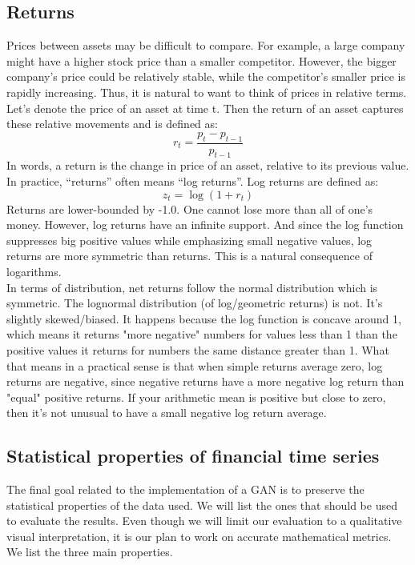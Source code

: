 \documentclass{article}
\begin{document}
\begin{multicols}{2}
    \subsection*{Returns}
    Prices between assets may be difficult to compare. For example, a large company might have a higher stock price than a smaller competitor. However, the bigger company's price could be relatively stable, while the competitor's smaller price is rapidly increasing. Thus, it is natural to want to think of prices in relative terms. Let's denote the price of an asset at time t. Then the return of an asset captures these relative movements and is defined as:
    $$r_t = \frac{p_t - p_{t-1}}{p_{t-1}}$$
    In words, a return is the change in price of an asset, relative to its previous value. In practice, “returns” often means “log returns”. Log returns are defined as:
    $$z_t = \log(1+r_t)$$
    Returns are lower-bounded by -1.0. One cannot lose more than all of one's money. However, log returns have an infinite support. And since the log function suppresses big positive values while emphasizing small negative values, log returns are more symmetric than returns. This is a natural consequence of logarithms.\\
    In terms of distribution, net returns follow the normal distribution which is symmetric. The lognormal distribution (of log/geometric returns) is not. It's slightly skewed/biased. It happens because the log function is concave around 1, which means it returns "more negative" numbers for values less than 1 than the positive values it returns for numbers the same distance greater than 1. What that means in a practical sense is that when simple returns average zero, log returns are negative, since negative returns have a more negative log return than "equal" positive returns. If your arithmetic mean is positive but close to zero, then it's not unusual to have a small negative log return average. 
    
    \subsection*{Statistical properties of financial time series}
    The final goal related to the implementation of a GAN is to preserve the statistical properties of the data used. We will list the ones that should be used to evaluate the results. Even though we will limit our evaluation to a qualitative visual interpretation, it is our plan to work on accurate mathematical metrics. We list the three main properties. \\

\end{multicols}
\end{document}
